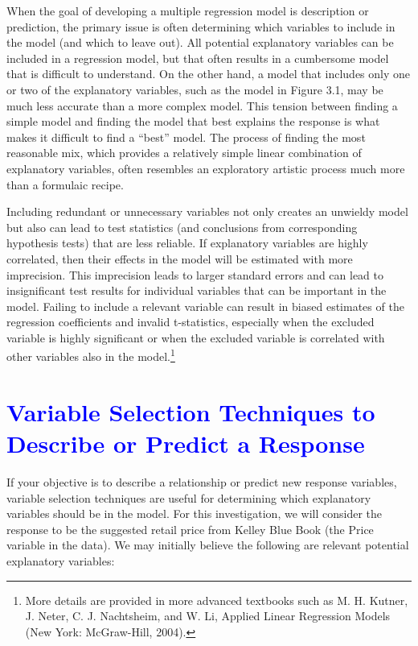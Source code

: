 \documentclass[
]{report}
\begin{document}
When the goal of developing a multiple regression model is description or prediction, the primary issue is often determining which variables to include in the model (and which to leave out). All potential explanatory variables can be included in a regression model, but that often results in a cumbersome model that is difficult to understand. On the other hand, a model that includes only one or two of the explanatory variables, such as the model in Figure 3.1, may be much less accurate than a more complex model. This tension between finding a simple model and finding the model that best explains the response is what makes it difficult to find a ``best'' model. The process of finding the most reasonable mix, which provides a relatively simple linear combination of explanatory variables, often resembles an exploratory artistic process much more than a formulaic recipe.

Including redundant or unnecessary variables not only creates an unwieldy model but also can lead to test statistics (and conclusions from corresponding hypothesis tests) that are less reliable. If explanatory variables are highly correlated, then their effects in the model will be estimated with more imprecision. This imprecision leads to larger standard errors and can lead to insignificant test results for individual variables that can be important in the model. Failing to include a relevant variable can result in biased estimates of the regression coefficients and invalid t-statistics, especially when the excluded variable is highly significant or when the excluded variable is correlated with other variables also in the model.\footnote{More details are provided in more advanced textbooks such as M. H. Kutner, J. Neter, C. J. Nachtsheim, and W. Li, Applied Linear Regression Models (New York: McGraw-Hill, 2004).}

\hypertarget{section-28}{%
\section{\texorpdfstring{\textcolor{blue}{Variable Selection Techniques to Describe or Predict a Response}}{}}\label{section-28}}

If your objective is to describe a relationship or predict new response variables, variable selection techniques are useful for determining which explanatory variables should be in the model. For this investigation, we will consider the response to be the suggested retail price from Kelley Blue Book (the Price variable in the data). We may initially believe the following are relevant potential explanatory variables:
\end{document}
